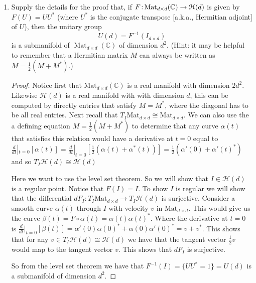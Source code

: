 \documentclass[11pt]{article}
\theoremstyle{definition}
\theoremstyle{definition}
\newcommand{\C}{{\mathbb C}}
\newcommand{\from}{\co\!\!}
\def\co{\colon}
\begin{document}
\begin{enumerate}
\begin{enumerate}
\begin{proof}
        \end{proof} 
    \end{enumerate}
	
	
	
	\item Supply the details for the proof that, if $F \from \operatorname{Mat}_{d \times d}(\C) \to \EuScript{H}(d)$ is given by $F(U) = UU^*$ (where $U^*$ is the conjugate transpose [a.k.a., Hermitian adjoint] of $U$), then the unitary group
	\[
		U(d) = F^{-1}(I_{d \times d})
	\]
	is a submanifold of $\operatorname{Mat}_{d \times d}(\C)$ of dimension $d^2$. (Hint: it may be helpful to remember that a Hermitian matrix $M$ can always be written as $M = \frac{1}{2}(M + M^*)$.)
	
    \begin{proof}
        Notice first that $\text{Mat}_{d\times d}(\C)$ is a real manifold with dimension $2d^2$. Likewise $\mathcal H(d)$ is a real manifold with with dimension $d$, 
		this can be computed by directly entries that satisfy $M=M^*$, where the diagonal has to be all real entries. Next recall that 
		$T_I\text{Mat}_{d\times d} \cong \text{Mat}_{d\times d}$. We can also use the a defining equation $M=\frac{1}{2}(M+M^*)$ to determine that any curve 
		$\alpha(t)$ that satisfies this relation would have a derivative at $t=0$ equal to 
		$\frac{d}{dt}|_{t=0}\left[\alpha(t)\right]=\frac{d}{dt}|_{t=0}\left[\frac{1}{2}(\alpha(t)+\alpha^*(t))\right]=\frac{1}{2}(\alpha'(0)+\alpha'(t)^*)$
		and so $T_I\mathcal H(d)\cong \mathcal H(d)$

		Here we want to use the level set theorem. So we will show that $I\in\mathcal H(d)$ is a regular point. Notice that $F(I)=I$. To show $I$ is regular
		we will show that the differential $dF_I:T_I \text{Mat}_{d\times d}\rightarrow T_I\mathcal H(d)$ is surjective.
		Consider a smooth curve $\alpha(t)$ through $I$ with velocity $v$ in $\text{Mat}_{d\times d}$. This would give us the curve $\beta(t)=F\circ\alpha(t)=\alpha(t)\alpha(t)^*$.
		Where the derivative at $t=0$ is $\frac{d}{dt}|_{t=0}\left[\beta(t)\right]=\alpha'(0)\alpha(0)^*+\alpha(0)\alpha'(0)^*=v+v^*$.
		This shows that for any $v\in T_I\mathcal H(d)\cong \mathcal H(d)$ we have that the tangent vector $\frac{1}{2}v$ would map to the tangent vector $v$.
		This shows that $dF_I$ is surjective.

		So from the level set theorem we have that $F^{-1}(I)=\{UU^*=1\}=U(d)$ is a submanifold of dimension $d^2$. 
    \end{proof}


\end{enumerate}
\end{document}
